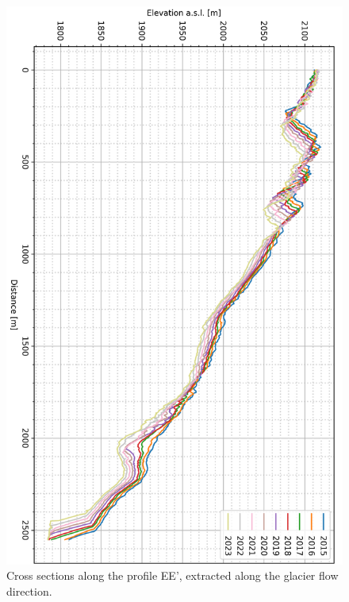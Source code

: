 \begin{figure}[p]
    \centering
\includegraphics[height=\textheight]{figures/appendix/profile_flow_rot.png}
    \caption{Cross sections along the profile EE', extracted along the glacier flow direction.}
\end{figure}

